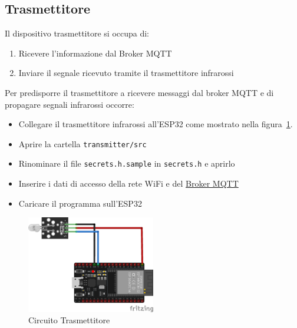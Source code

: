 \documentclass[a4paper,11pt]{article}
\begin{document}
    \subsection{Trasmettitore}
    \label{subsec:transmitter}

    Il dispositivo trasmettitore si occupa di:

    \begin{enumerate}
        \item Ricevere l'informazione dal Broker MQTT
        \item Inviare il segnale ricevuto tramite il trasmettitore infrarossi
    \end{enumerate}

    Per predisporre il trasmettitore a ricevere messaggi dal broker MQTT e di propagare segnali infrarossi occorre:

    \begin{itemize}
        \item Collegare il trasmettitore infrarossi all'ESP32 come mostrato nella figura~\ref{fig:circuito_trasmettitore}.

            
        \item Aprire la cartella \texttt{transmitter/src}
        \item Rinominare il file \texttt{secrets.h.sample} in \texttt{secrets.h} e aprirlo
        \item Inserire i dati di accesso della rete WiFi e del \hyperref[subsec:Broker]{Broker MQTT}
        \item Caricare il programma sull'ESP32
    \end{itemize}

    \begin{figure}[H]
        \centering
        \includegraphics[width=0.5\textwidth,height=\textheight,keepaspectratio]{assets/transmitter_fritzing}
        \caption{Circuito Trasmettitore}
        \label{fig:circuito_trasmettitore}
    \end{figure}
\end{document}
